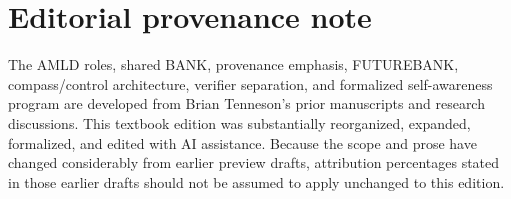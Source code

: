 \documentclass[11pt,openany]{book}
\theoremstyle{definition}
\theoremstyle{remark}
\begin{document}
\chapter*{Editorial provenance note}
The AMLD roles, shared BANK, provenance emphasis, FUTUREBANK, compass/control architecture, verifier separation, and formalized self-awareness program are developed from Brian Tenneson's prior manuscripts and research discussions. This textbook edition was substantially reorganized, expanded, formalized, and edited with AI assistance. Because the scope and prose have changed considerably from earlier preview drafts, attribution percentages stated in those earlier drafts should not be assumed to apply unchanged to this edition.
\end{document}
